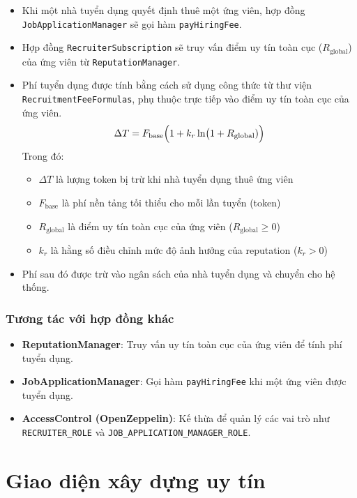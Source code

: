 \begin{itemize}
  \item Khi một nhà tuyển dụng quyết định thuê một ứng viên, hợp đồng \texttt{JobApplicationManager} sẽ gọi hàm \texttt{payHiringFee}.
  \item Hợp đồng \texttt{RecruiterSubscription} sẽ truy vấn điểm uy tín toàn cục ($R_{\text{global}}$) của ứng viên từ \texttt{ReputationManager}.
  \item Phí tuyển dụng được tính bằng cách sử dụng công thức từ thư viện \texttt{RecruitmentFeeFormulas}, phụ thuộc trực tiếp vào điểm uy tín toàn cục của ứng viên.
    \[ \Delta T = F_{\mathrm{base}}\Bigl(1 + k_r \ln\bigl(1 + R_{\text{global}}) \Bigr) \]
    Trong đó: 
    \begin{itemize}
      \item $\Delta T$ là lượng token bị trừ khi nhà tuyển dụng thuê ứng viên
      \item $F_{\mathrm{base}}$ là phí nền tảng tối thiểu cho mỗi lần tuyển (token)
      \item $R_{\text{global}}$ là điểm uy tín toàn cục của ứng viên ($R_{\text{global}}\ge0$)
      \item $k_r$ là hằng số điều chỉnh mức độ ảnh hưởng của reputation ($k_r>0$)
    \end{itemize}
  \item Phí sau đó được trừ vào ngân sách của nhà tuyển dụng và chuyển cho hệ thống.
\end{itemize}

\subsubsection{Tương tác với hợp đồng khác}

\begin{itemize}
  \item \textbf{ReputationManager}: Truy vấn uy tín toàn cục của ứng viên để tính phí tuyển dụng.
  \item \textbf{JobApplicationManager}: Gọi hàm \texttt{payHiringFee} khi một ứng viên được tuyển dụng.
  \item \textbf{AccessControl (OpenZeppelin)}: Kế thừa để quản lý các vai trò như \texttt{RECRUITER\_ROLE} và \texttt{JOB\_APPLICATION\_MANAGER\_ROLE}.
\end{itemize}


\section{Giao diện xây dựng uy tín}

